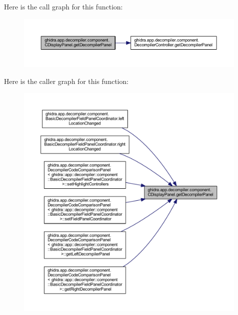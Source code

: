 Here is the call graph for this function\+:
\nopagebreak
\begin{figure}[H]
\begin{center}
\leavevmode
\includegraphics[width=350pt]{classghidra_1_1app_1_1decompiler_1_1component_1_1_c_display_panel_aa3f83a21fba71bc8d3d6acfb8efb3882_cgraph}
\end{center}
\end{figure}
Here is the caller graph for this function\+:
\nopagebreak
\begin{figure}[H]
\begin{center}
\leavevmode
\includegraphics[width=350pt]{classghidra_1_1app_1_1decompiler_1_1component_1_1_c_display_panel_aa3f83a21fba71bc8d3d6acfb8efb3882_icgraph}
\end{center}
\end{figure}
\mbox{\label{classghidra_1_1app_1_1decompiler_1_1component_1_1_c_display_panel_aff38484bccab2cb48723394fd2f83486}} 
